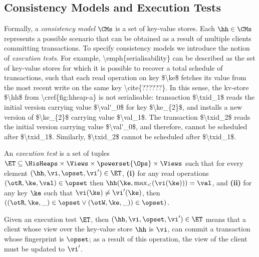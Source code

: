 \subsection{Consistency Models and Execution Tests}
Formally, a \emph{consistency model} $\CMs$ is a set of key-value stores. 
Each $\hh \in \CMs$ represents a possible scenario that 
can be obtained as a result of multiple clients committing transactions. 
To specify consistency models we introduce the notion of \emph{execution tests}. 
\ac{
For example, \emph{serialisability} can be described as the set 
of key-value stores for which it is possible to recover a total schedule of transactions, 
such that each read operation on key $\ke$ fetches its value from the 
most recent write on the same key \cite{??????}.
In this sense, the kv-store $\hh$ from \cref{fig:hheap-a} is not serialisable: 
transaction $\txid_1$ reads the initial version carrying value $\val'_0$ for key $\ke_{2}$, 
and installs a new version of $\ke_{2}$ carrying value $\val_1$. The transaction $\txid_2$ 
reads the initial version carrying value $\val'_0$, and therefore, 
cannot be scheduled after $\txid_1$. Similarly, $\txid_2$ cannot be scheduled after $\txid_1$.
}
\begin{definition}
\label{def:execution.test}
An \emph{execution test} is a set of tuples $\ET \subseteq \HisHeaps \times \Views \times \powerset{\Ops} \times \Views$ 
such that for every element $(\hh, \vi, \opset, \vi') \in \ET$,
\textbf{(i)} for any read operations $(\otR, \ke, \val) \in \opset$ then $\hh(\ke, \max_{<}(\vi(\ke))) = \val$, 
and \textbf{(ii)}  for any key \( \ke \) such that $\vi(\ke) \neq \vi'(\ke)$, 
then $( (\otR, \ke, \_) \in \opset \vee (\otW, \ke, \_)) \in \opset)$.
\end{definition}
Given an execution test $\ET$, 
then $(\hh, \vi, \opset, \vi') \in \ET$ means that 
a client whose view over the key-value store $\hh$ is $\vi$, 
can commit a transaction whose fingerprint is $\opset$;
as a result of this operation, the view of the client must be updated to $\vi'$.
